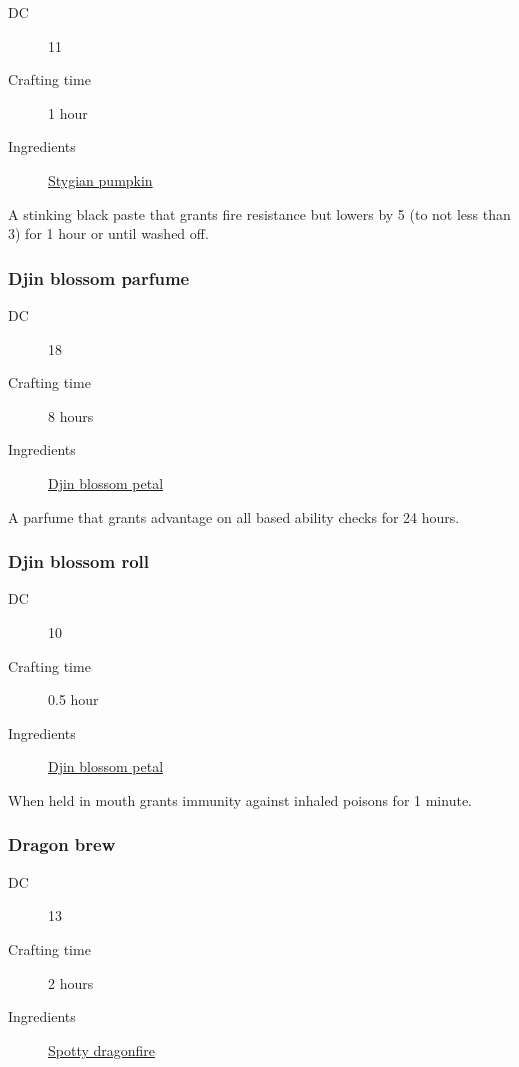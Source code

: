 \begin{description}
\item [DC] 11 \survival
\item [Crafting time] 1 hour
\item [Ingredients] \hyperref[Stygian Pumpkin]{Stygian pumpkin}
\end{description}

A stinking black paste that grants fire resistance but lowers \charisma by 5 (to not less than 3)
for 1 hour or until washed off.

\subsubsection{Djin blossom parfume}

\begin{description}
\item [DC] 18 \nature
\item [Crafting time] 8 hours
\item [Ingredients] \hyperref[Djin Blossom]{Djin blossom petal}
\end{description}

A parfume that grants advantage on all \charisma{} based ability checks for 24 hours.

\subsubsection{Djin blossom roll}
\label{Djin blossom roll}

\begin{description}
\item [DC] 10 \survival
\item [Crafting time] 0.5 hour
\item [Ingredients] \hyperref[Djin Blossom]{Djin blossom petal}
\end{description}

When held in mouth grants immunity against inhaled poisons for 1 minute.

\subsubsection{Dragon brew}
\label{Dragon brew}

\begin{description}
\item [DC] 13 \medicine
\item [Crafting time] 2 hours
\item [Ingredients] \hyperref[Spotty Dragonfire]{Spotty dragonfire}
\end{description}

